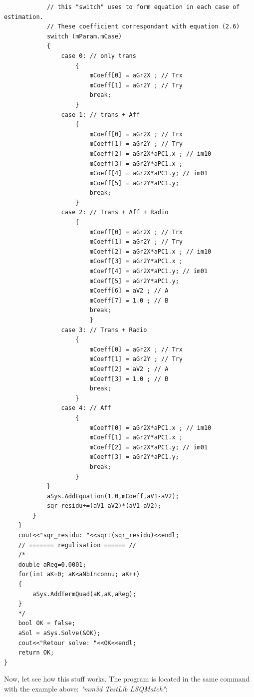 \documentclass[twoside]{article}
\begin{document}
\begin{lstlisting}
            // this "switch" uses to form equation in each case of estimation.
            // These coefficient correspondant with equation (2.6)
            switch (mParam.mCase)
            {
                case 0: // only trans
                    {
                        mCoeff[0] = aGr2X ; // Trx
                        mCoeff[1] = aGr2Y ; // Try
                        break;
                    }
                case 1: // trans + Aff
                    {
                        mCoeff[0] = aGr2X ; // Trx
                        mCoeff[1] = aGr2Y ; // Try
                        mCoeff[2] = aGr2X*aPC1.x ; // im10
                        mCoeff[3] = aGr2Y*aPC1.x ;
                        mCoeff[4] = aGr2X*aPC1.y; // im01
                        mCoeff[5] = aGr2Y*aPC1.y;
                        break;
                    }
                case 2: // Trans + Aff + Radio
                    {
                        mCoeff[0] = aGr2X ; // Trx
                        mCoeff[1] = aGr2Y ; // Try
                        mCoeff[2] = aGr2X*aPC1.x ; // im10
                        mCoeff[3] = aGr2Y*aPC1.x ;
                        mCoeff[4] = aGr2X*aPC1.y; // im01
                        mCoeff[5] = aGr2Y*aPC1.y;
                        mCoeff[6] = aV2 ; // A
                        mCoeff[7] = 1.0 ; // B
                        break;
                        }
                case 3: // Trans + Radio
                    {
                        mCoeff[0] = aGr2X ; // Trx
                        mCoeff[1] = aGr2Y ; // Try
                        mCoeff[2] = aV2 ; // A
                        mCoeff[3] = 1.0 ; // B
                        break;
                    }
                case 4: // Aff
                    {
                        mCoeff[0] = aGr2X*aPC1.x ; // im10
                        mCoeff[1] = aGr2Y*aPC1.x ;
                        mCoeff[2] = aGr2X*aPC1.y; // im01
                        mCoeff[3] = aGr2Y*aPC1.y;
                        break;
                    }
            }
            aSys.AddEquation(1.0,mCoeff,aV1-aV2);
            sqr_residu+=(aV1-aV2)*(aV1-aV2);
        }
    }
    cout<<"sqr_residu: "<<sqrt(sqr_residu)<<endl;
    // ======= regulisation ====== //
    /*
    double aReg=0.0001;
    for(int aK=0; aK<aNbInconnu; aK++)
    {
        aSys.AddTermQuad(aK,aK,aReg);
    }
    */
    bool OK = false;
    aSol = aSys.Solve(&OK);
    cout<<"Retour solve: "<<OK<<endl;
    return OK;
}
\end{lstlisting}

Now, let see how this stuff works. The program is located in the same command with the example above: \textit{"mm3d TestLib LSQMatch"}:
\end{document}
